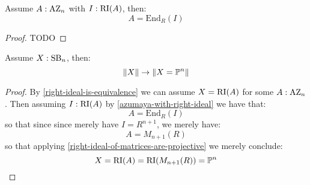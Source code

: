 
\begin{lemma}\label{azumaya-with-right-ideal}
Assume $A:\mathrm{AZ}_n$ with $I:\mathrm{RI}(A)$, then:
\[A = \mathrm{End}_R(I)\]
\end{lemma}

\begin{proof}
TODO
\end{proof}



\begin{theorem}
Assume $X:\mathrm{SB}_n$, then:
\[\lVert X \rVert\to\lVert X=\mathbb{P}^n \rVert\]
\end{theorem}

\begin{proof}
By \cref{right-ideal-is-equivalence} we can assume $X=\mathrm{RI}(A)$ for some $A:\mathrm{AZ}_n$. Then assuming $I:\mathrm{RI}(A)$ by \cref{azumaya-with-right-ideal} we have that:
\[A=\mathrm{End}_R(I)\]
so that since since merely have $I=R^{n+1}$, we merely have:
\[A = M_{n+1}(R)\]
so that applying \cref{right-ideal-of-matrices-are-projective} we merely conclude:
\[X=\mathrm{RI}(A)=\mathrm{RI}(M_{n+1}(R)) = \mathbb{P}^n\]
\end{proof}